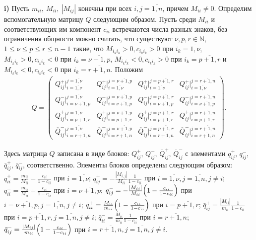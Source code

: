 \textbf{i)} Пусть $m_{ii},\: M_{ii},\:|M_{ij}|$ конечны при всех $i,j=\overline{1,n}$, причем ${M_{ii}\neq 0}$.
Определим вспомогательную матрицу $Q$ следующим образом. Пусть среди $M_{ii}$ и соответствующих им компонент $c_{ii}$ встречаются числа разных знаков, без ограничения общности можно считать, что существуют $\nu, p, r\in \mathbb{N}$,  $1\leqslant \nu\leqslant p\leqslant r\leqslant n-1$ такие, что $M_{i_ki_k}>0, c_{i_ki_k}>0$ при $i_k=\overline{1,\nu}$, $M_{i_ki_k}>0, c_{i_ki_k}<0$ при $i_k=\overline{\nu+1,p}$, $M_{i_ki_k}<0, c_{i_ki_k}>0$ при $i_k=\overline{p+1,r}$  и $M_{i_ki_k}<0, c_{i_ki_k}<0$ при $i_k=\overline{r+1,n}$.
Положим
\begin{multline*}
Q=
\begin{pmatrix}
Q^+_{ij}\bigr|_{i=\overline{1,\nu}}^{j=\overline{1,\nu}}& Q^+_{ij}\bigr|_{i=\overline{1,\nu}}^{j=\overline{\nu+1,p}}&
Q^+_{ij}\bigr|_{i=\overline{1,\nu}}^{j=\overline{p+1,r}}& Q^+_{ij}\bigr|_{i=\overline{1,\nu}}^{j=\overline{r+1,n}}\\
Q^-_{ij}\bigr|_{i=\overline{\nu+1,p}}^{j=\overline{1,\nu}}&
Q^-_{ij}\bigr|_{i=\overline{\nu+1,p}}^{j=\overline{\nu+1,p}}&
Q^-_{ij}\bigr|_{i=\overline{\nu+1,p}}^{j=\overline{p+1,r}}&
Q^-_{ij}\bigr|_{i=\overline{\nu+1,p}}^{j=\overline{r+1,n}}\\
\overline{Q}^+_{ij}\bigr|_{i=\overline{p+1,r}}^{j=\overline{1,\nu}}&
\overline{Q}^+_{ij}\bigr|_{i=\overline{p+1,r}}^{j=\overline{\nu+1,p}}&
\overline{Q}^+_{ij}\bigr|_{i=\overline{p+1,r}}^{j=\overline{p+1,r}}&
\overline{Q}^+_{ij}\bigr|_{i=\overline{p+1,r}}^{j=\overline{r+1,n}}\\
\overline{Q}^-_{ij}\bigr|_{i=\overline{r+1,n}}^{j=\overline{1,\nu}}&
\overline{Q}^-_{ij}\bigr|_{i=\overline{r+1,n}}^{j=\overline{\nu+1,p}}&
\overline{Q}^-_{ij}\bigr|_{i=\overline{r+1,n}}^{j=\overline{p+1,r}}&
\overline{Q}^-_{ij}\bigr|_{i=\overline{r+1,n}}^{j=\overline{r+1,n}}
\end{pmatrix}.
\end{multline*}


Здесь матрица $Q$ записана в виде блоков:  $Q^+_{ij}$, $Q^-_{ij}$, $\overline{Q}^+_{ij}$, $\overline{Q}^-_{ij}$ с элементами $q^+_{ij}$, $q^-_{ij}$, $\bar{q}^+_{ij}$, $\bar{q}^-_{ij}$, соответственно. Элементы блоков определены следующим образом: $q^+_{ii}=\frac{m_{ii}}{M_{ii}}-\frac{c_{ii}}{1-c_{ii}}$ при $i=\overline{1, \nu}$; $q^+_{ij}=-\frac{|M_{i,j}|}{M_{ii}} \frac{1}{1-c_{ii}}$ при $i=\overline{1, \nu}, j=\overline{1, n}, j\neq i$; $q^-_{ii}=\frac{m_{ii}}{M_{ii}}+\frac{c_{ii}}{1-c_{ii}}$ при $i=\overline{\nu+1, p}$; $q^-_{ij}=-\frac{|M_{ij}|}{M_{ii}} \Bigl(1-\frac{c_{ii}}{1-c_{ii}}\Bigr)$ при $i=\overline{\nu+1, p}, j=\overline{1,n}, j\neq i$; $\bar{q}^+_{ii}=\frac{M_{ii}}{m_{ii}}\Bigl(1-\frac{c_{ii}}{1-c_{ii}}\Bigr)$  при $i=\overline{p+1, r}$; $\bar{q}^+_{ij}=\frac{|M_{ij}|}{m_{ii}}\frac{1}{1-c_{ii}}$ при $i=\overline{p+1, r}, j=\overline{1,n}, j\neq i$; $\bar{q}^-_{ii}=\frac{M_{ii}}{m_{ii}}\frac{1}{1-c_{ii}}$ при $i=\overline{r+1, n}$; $\bar{q}^-_{ij}= \frac{|M_{ij}|}{m_{ii}}\Bigl(1-\frac{c_{ii}}{1-c_{ii}}\Bigr)$ при $i=\overline{r+1, n}, j=\overline{1,n},  j\neq i$.

